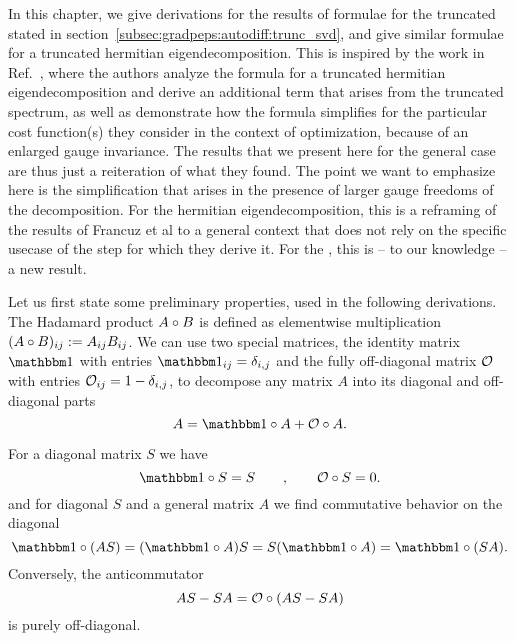 In this chapter, we give derivations for the results of  formulae for the truncated  stated in section~\ref{subsec:gradpeps:autodiff:trunc_svd}, and give similar formulae for a truncated hermitian eigendecomposition.
%
This is inspired by the work in Ref.~\cite{francuz2023}, where the authors analyze the  formula for a truncated hermitian eigendecomposition and derive an additional term that arises from the truncated spectrum, as well as demonstrate how the  formula simplifies for the particular cost function(s) they consider in the context of  optimization, because of an enlarged gauge invariance.
%
The results that we present here for the general case are thus just a reiteration of what they found.
%
The point we want to emphasize here is the simplification that arises in the presence of larger gauge freedoms of the decomposition.
%
For the hermitian eigendecomposition, this is a reframing of the results of Francuz et al to a general context that does not rely on the specific usecase of the  step for which they derive it.
%
For the , this is -- to our knowledge -- a new result.




Let us first state some preliminary properties, used in the following derivations.
%
The Hadamard product $A \circ B$ is defined as elementwise multiplication $(A \circ B)_{ij} := A_{ij} B_{ij}$.
%
We can use two special matrices, the identity matrix $\eye$ with entries $\eye_{ij} = \delta_{i,j}$ and the fully off-diagonal matrix $\mathcal{O}$ with entries $\mathcal{O}_{ij} = 1 - \delta_{i,j}$, to decompose any matrix $A$ into its diagonal and off-diagonal parts
\begin{equation}
    \label{eq:autodiff_derivations:hadamard_decompose}
    A = \eye \hadamard A + \Off \hadamard A
    .
\end{equation}

For a diagonal matrix $S$ we have
\begin{equation}
    \label{eq:autodiff_derivations:hadamard_with_diagonal}
    \eye \hadamard S = S
    \qquad , \qquad
    \Off \hadamard S = 0
    .
\end{equation}
and for diagonal $S$ and a general matrix $A$ we find commutative behavior on the diagonal
\begin{equation}
    \eye \hadamard (AS) = (\eye \hadamard A) S = S (\eye \hadamard A) = \eye \hadamard (SA)
    \label{eq:autodiff_derivations:hadamard_diagonal_commutation}
    .
\end{equation}
%
Conversely, the anticommutator
\begin{equation}
    \label{eq:autodiff_derivations:hadamard_anticomm_offdiag}
    AS - SA = \Off \hadamard \rBr{AS - SA}
\end{equation}
is purely off-diagonal.

